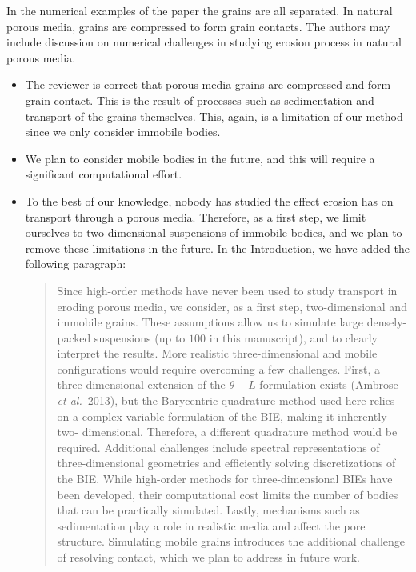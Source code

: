 \documentclass[11pt]{article}
\newcommand{\comment}[1]{{\color{blue} #1}}
\begin{document}
\noindent
\comment{In the numerical examples of the paper the grains are all
separated. In natural porous media, grains are compressed to form grain
contacts. The authors may include discussion on numerical challenges in
studying erosion process in natural porous media.}
\begin{itemize}
  \item The reviewer is correct that porous media grains are compressed
    and form grain contact. This is the result of processes such as
    sedimentation and transport of the grains themselves. This, again,
    is a limitation of our method since we only consider immobile
    bodies.

  \item We plan to consider mobile bodies in the future, and this will
    require a significant computational effort.

  \item To the best of our knowledge, nobody has studied the effect
    erosion has on transport through a porous media. Therefore, as a
    first step, we limit ourselves to two-dimensional suspensions of
    immobile bodies, and we plan to remove these limitations in the
    future. In the Introduction, we have added the following paragraph:
    \begin{quotation}
      \noindent
      Since high-order methods have never been used to study transport
      in eroding porous media, we consider, as a first step,
      two-dimensional and immobile grains. These assumptions allow us to
      simulate large densely-packed suspensions (up to $100$ in this
      manuscript), and to clearly interpret the results. More realistic
      three-dimensional and mobile configurations would require
      overcoming a few challenges. First, a three-dimensional extension
      of the $\theta-L$ formulation exists (Ambrose {\em et al.}~2013),
      but the Barycentric quadrature method used here relies on a
      complex variable formulation of the BIE, making it inherently two-
      dimensional. Therefore, a different quadrature method would be
      required. Additional challenges include spectral representations
      of three-dimensional geometries and efficiently solving
      discretizations of the BIE. While high-order methods for
      three-dimensional BIEs have been developed, their computational
      cost limits the number of bodies that can be practically
      simulated. Lastly, mechanisms such as sedimentation play a role in
      realistic media and affect the pore structure. Simulating mobile
      grains introduces the additional challenge of resolving contact,
      which we plan to address in future work.
    \end{quotation}
\end{itemize}
\end{document}
